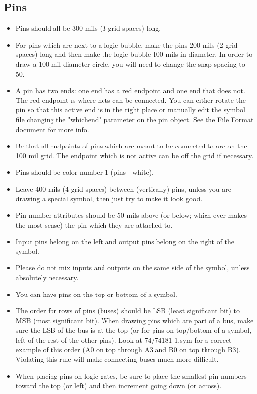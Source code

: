 \documentclass{article}
\begin{document}
\subsection{Pins}

\begin{itemize}
\item Pins should all be 300 mils (3 grid spaces) long.
\item For pins which are next to a logic bubble, make the pins 200 mils 
      (2 grid spaces) long and then make the logic bubble 100 mils in
      diameter.  In order to draw a 100 mil diameter circle, you will need
      to change the snap spacing to 50.
\item A pin has two ends: one end has a red endpoint and one end that does
      not.  The red endpoint is where nets can be connected.  You can
      either rotate the pin so that this active end is in the right place 
      or manually edit the symbol file changing the "whichend" parameter
      on the pin object.  See the File Format document for more info.
\item Be that all endpoints of pins which are meant to be connected to are on
      the 100 mil grid.  The endpoint which is not active can be off the 
      grid if necessary.
\item Pins should be color number 1 (pins | white).
\item Leave 400 mils (4 grid spaces) between (vertically) pins, unless
      you are drawing a special symbol, then just try to make it look
      good.
\item Pin number attributes should be 50 mils above (or below; which
      ever makes the most sense) the pin which they are attached to.
\item Input pins belong on the left and output pins belong on the right of 
      the symbol.
\item Please do not mix inputs and outputs on the same side of the symbol,
      unless absolutely necessary. 
\item You can have pins on the top or bottom of a symbol.
\item The order for rows of pins (buses) should be LSB (least significant
      bit) to MSB (most significant bit).  When drawing pins which
      are part of a bus, make sure the LSB of the bus is at the top
      (or for pins on top/bottom of a symbol, left of the rest of
      the other pins).  Look at 74/74181-1.sym for a correct example
      of this order (A0 on top through A3 and B0 on top through B3).
      Violating this rule will make connecting buses much more difficult.
\item When placing pins on logic gates, be sure to place the smallest
      pin numbers toward the top (or left) and then increment going down
      (or across).

\end{itemize}
\end{document}
